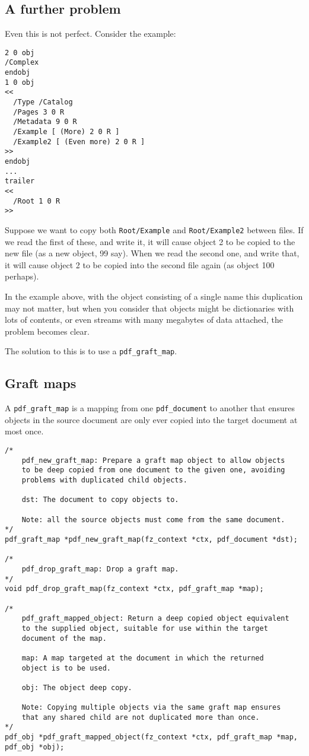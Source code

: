 \documentclass[oneside]{book}
\begin{document}
\subsection{A further problem}

Even this is not perfect. Consider the example:

\begin{lstlisting}
2 0 obj
/Complex
endobj
1 0 obj
<<
  /Type /Catalog
  /Pages 3 0 R
  /Metadata 9 0 R
  /Example [ (More) 2 0 R ]
  /Example2 [ (Even more) 2 0 R ]
>>
endobj
...
trailer
<<
  /Root 1 0 R
>>
\end{lstlisting}

Suppose we want to copy both \texttt{Root/Example} and \texttt{Root/Example2} between files. If we read the first of these, and write it, it will cause object 2 to be copied to the new file (as a new object, 99 say). When we read the second one, and write that, it will cause object 2 to be copied into the second file again (as object 100 perhaps).

In the example above, with the object consisting of a single name this duplication may not matter, but when you consider that objects might be dictionaries with lots of contents, or even streams with many megabytes of data attached, the problem becomes clear.

The solution to this is to use a \texttt{pdf\_graft\_map}.

\subsection{Graft maps}

A \texttt{pdf\_graft\_map} is a mapping from one \texttt{pdf\_document} to another that ensures objects in the source document are only ever copied into the target document at most once.

\begin{lstlisting}
/*
	pdf_new_graft_map: Prepare a graft map object to allow objects
	to be deep copied from one document to the given one, avoiding
	problems with duplicated child objects.

	dst: The document to copy objects to.

	Note: all the source objects must come from the same document.
*/
pdf_graft_map *pdf_new_graft_map(fz_context *ctx, pdf_document *dst);

/*
	pdf_drop_graft_map: Drop a graft map.
*/
void pdf_drop_graft_map(fz_context *ctx, pdf_graft_map *map);

/*
	pdf_graft_mapped_object: Return a deep copied object equivalent
	to the supplied object, suitable for use within the target
	document of the map.

	map: A map targeted at the document in which the returned
	object is to be used.

	obj: The object deep copy.

	Note: Copying multiple objects via the same graft map ensures
	that any shared child are not duplicated more than once.
*/
pdf_obj *pdf_graft_mapped_object(fz_context *ctx, pdf_graft_map *map, pdf_obj *obj);
\end{lstlisting}
\end{document}
